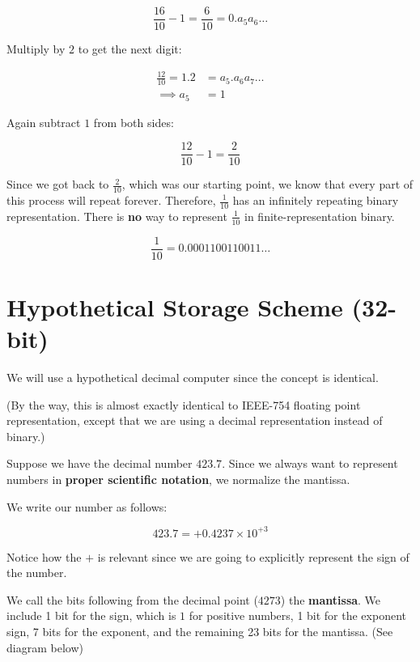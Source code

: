 \documentclass[12pt]{article}
\begin{document}
\begin{equation*}
  \frac{16}{10} - 1 = \frac{6}{10} = 0.a_5 a_6 \dots
\end{equation*}

Multiply by $2$ to get the next digit:

\begin{align*}
  \frac{12}{10} = 1.2 &= a_5.a_6 a_7\dots \\
  \implies a_5 &= 1
\end{align*}

Again subtract $1$ from both sides:

\begin{equation*}
  \frac{12}{10} - 1 = \frac{2}{10} 
\end{equation*}

Since we got back to $\frac{2}{10}$, which was our starting point, we know that
every part of this process will repeat forever. Therefore, $\frac{1}{10}$ has
an infinitely repeating binary representation. There is \textbf{no} way to 
represent $\frac{1}{10}$ in finite-representation binary.

\begin{equation*}
  \frac{1}{10} = 0.0001100110011\dots
\end{equation*}

\section{Hypothetical Storage Scheme (32-bit)}

We will use a hypothetical decimal computer since the concept is identical.

(By the way, this is almost exactly identical to IEEE-754 floating point
representation, except that we are using a decimal representation instead of
binary.)

Suppose we have the decimal number $423.7$. Since we always want to represent
numbers in \textbf{proper scientific notation}, we normalize the mantissa.

We write our number as follows:

\begin{equation*}
  423.7 = +0.4237 \times 10^{+3}
\end{equation*}

Notice how the $+$ is relevant since we are going to explicitly represent the
sign of the number.

We call the bits following from the decimal point ($4273$) the \textbf{mantissa}.
We include 1 bit for the sign, which is $1$ for positive numbers, 1 bit for the
exponent sign, 7 bits for the exponent, and the remaining 23 bits for the
mantissa. (See diagram below)
\end{document}
